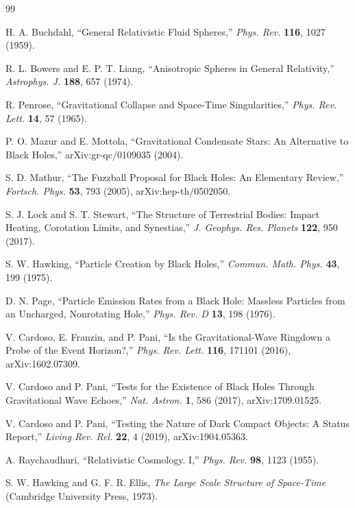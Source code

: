 \documentclass[11pt]{article}
\begin{document}
\begin{thebibliography}{99}

 H. A. Buchdahl, ``General Relativistic Fluid Spheres,'' \textit{Phys. Rev.} \textbf{116}, 1027 (1959).

 R. L. Bowers and E. P. T. Liang, ``Anisotropic Spheres in General Relativity,'' \textit{Astrophys. J.} \textbf{188}, 657 (1974).

 R. Penrose, ``Gravitational Collapse and Space-Time Singularities,'' \textit{Phys. Rev. Lett.} \textbf{14}, 57 (1965).

 P. O. Mazur and E. Mottola, ``Gravitational Condensate Stars: An Alternative to Black Holes,'' arXiv:gr-qc/0109035 (2004).

 S. D. Mathur, ``The Fuzzball Proposal for Black Holes: An Elementary Review,'' \textit{Fortsch. Phys.} \textbf{53}, 793 (2005), arXiv:hep-th/0502050.

 S. J. Lock and S. T. Stewart, ``The Structure of Terrestrial Bodies: Impact Heating, Corotation Limits, and Synestias,'' \textit{J. Geophys. Res. Planets} \textbf{122}, 950 (2017).

 S. W. Hawking, ``Particle Creation by Black Holes,'' \textit{Commun. Math. Phys.} \textbf{43}, 199 (1975).

 D. N. Page, ``Particle Emission Rates from a Black Hole: Massless Particles from an Uncharged, Nonrotating Hole,'' \textit{Phys. Rev. D} \textbf{13}, 198 (1976).

 V. Cardoso, E. Franzin, and P. Pani, ``Is the Gravitational-Wave Ringdown a Probe of the Event Horizon?,'' \textit{Phys. Rev. Lett.} \textbf{116}, 171101 (2016), arXiv:1602.07309.

 V. Cardoso and P. Pani, ``Tests for the Existence of Black Holes Through Gravitational Wave Echoes,'' \textit{Nat. Astron.} \textbf{1}, 586 (2017), arXiv:1709.01525.

 V. Cardoso and P. Pani, ``Testing the Nature of Dark Compact Objects: A Status Report,'' \textit{Living Rev. Rel.} \textbf{22}, 4 (2019), arXiv:1904.05363.

 A. Raychaudhuri, ``Relativistic Cosmology. I,'' \textit{Phys. Rev.} \textbf{98}, 1123 (1955).

 S. W. Hawking and G. F. R. Ellis, \textit{The Large Scale Structure of Space-Time} (Cambridge University Press, 1973).


\end{thebibliography}
\end{document}
